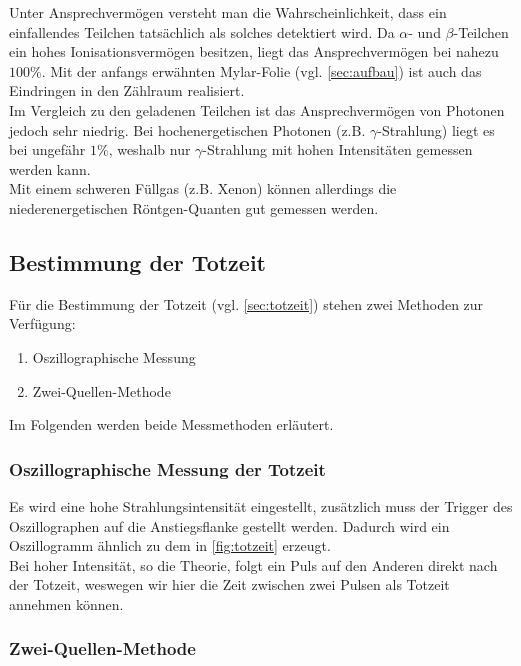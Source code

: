 Unter Ansprechvermögen versteht man die Wahrscheinlichkeit, dass ein einfallendes Teilchen tatsächlich als solches 
detektiert wird. Da $\alpha$- und $\beta$-Teilchen ein hohes Ionisationsvermögen besitzen, liegt das Ansprechvermögen
bei nahezu $100\%$. Mit der anfangs erwähnten Mylar-Folie (vgl. \autoref{sec:aufbau}) ist auch das Eindringen in
den Zählraum realisiert.
\\
Im Vergleich zu den geladenen Teilchen ist das Ansprechvermögen von Photonen jedoch sehr niedrig. Bei hochenergetischen
Photonen (z.B. $\gamma$-Strahlung) liegt es bei ungefähr $1\%$, weshalb nur $\gamma$-Strahlung mit hohen
Intensitäten gemessen werden kann.
\\
Mit einem schweren Füllgas (z.B. Xenon) können allerdings die niederenergetischen Röntgen-Quanten gut gemessen werden.

\subsection{Bestimmung der Totzeit}
\label{sec:bestimmung-totzeit}

Für die Bestimmung der Totzeit (vgl. \autoref{sec:totzeit}) stehen zwei Methoden zur Verfügung:
\begin{enumerate}
	\item Oszillographische Messung
	\item Zwei-Quellen-Methode
\end{enumerate}
Im Folgenden werden beide Messmethoden erläutert.

\subsubsection{Oszillographische Messung der Totzeit}
\label{sec:theo:oszillographisch}

Es wird eine hohe Strahlungsintensität eingestellt, zusätzlich muss der Trigger des Oszillographen auf die 
Anstiegsflanke gestellt werden. Dadurch wird ein Oszillogramm ähnlich zu dem in \autoref{fig:totzeit} erzeugt.
\\
Bei hoher Intensität, so die Theorie, folgt ein Puls auf den Anderen direkt nach der Totzeit, weswegen wir hier die
Zeit zwischen zwei Pulsen als Totzeit annehmen können.

\subsubsection{Zwei-Quellen-Methode}
\label{sec:theo:zwei-quellen}

